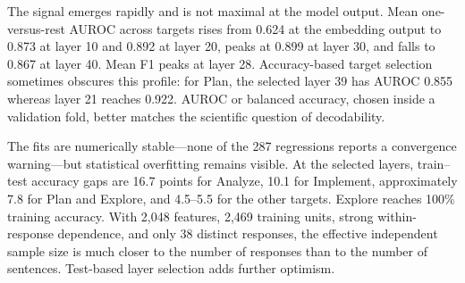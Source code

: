 \begin{table}[t]
\centering
\caption{Accuracy-selected Schoenfeld boundary probes on the sentence-level
test split.  Prevalence is over all 3,087 units.  $\Delta$Maj. subtracts the
always-negative accuracy.  Balanced accuracy is derived from the saved test
confusion matrix.  Layer selection and evaluation use the same test split and
are therefore selection-optimistic.  }
\label{tab:schoenfeld-boundary-probes}
\end{table}

The signal emerges rapidly and is not maximal at the model output.  Mean
one-versus-rest AUROC across targets rises from 0.624 at the embedding output
to 0.873 at layer 10 and 0.892 at layer 20, peaks at 0.899 at layer 30, and
falls to 0.867 at layer 40.  Mean F1 peaks at layer 28.  Accuracy-based target
selection sometimes obscures this profile: for Plan, the selected layer 39
has AUROC 0.855 whereas layer 21 reaches 0.922.  AUROC or balanced accuracy,
chosen inside a validation fold, better matches the scientific question of
decodability.

The fits are numerically stable---none of the 287 regressions reports a
convergence warning---but statistical overfitting remains visible.  At the
selected layers, train--test accuracy gaps are 16.7 points for Analyze, 10.1
for Implement, approximately 7.8 for Plan and Explore, and 4.5--5.5 for the
other targets.  Explore reaches 100\% training accuracy.  With 2,048 features,
2,469 training units, strong within-response dependence, and only 38 distinct
responses, the effective independent sample size is much closer to the number
of responses than to the number of sentences.  Test-based layer selection
adds further optimism.

